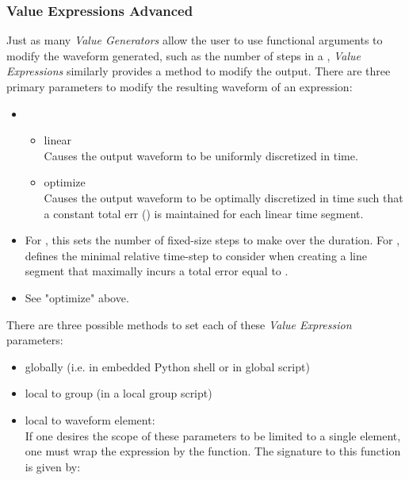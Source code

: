 \subsubsection{Value Expressions Advanced}
Just as many \textit{Value Generators} allow the user to use functional arguments to
modify the waveform generated, such as the number of steps in a ,
\textit{Value Expressions} similarly provides a method to modify the output.
%
There are three primary parameters to modify the resulting waveform of an
expression:
\begin{itemize}
  \item {}
    \begin{itemize}
    \item linear\\
      Causes the output waveform to be uniformly discretized in time.
    \item optimize\\
      Causes the output waveform to be optimally discretized in time such that a
      constant total err () is maintained for each linear
      time segment.
    \end{itemize}
  \item {}
      For , this sets the number of fixed-size steps
      to make over the duration.
      For ,  defines the
      minimal relative time-step to consider when creating a line segment that
      maximally incurs a total error equal to .
  \item {}
      See "optimize" above.
\end{itemize}
%
There are three possible methods to set each of these \textit{Value Expression}
parameters:
\begin{itemize}
  \item globally (i.e. in embedded Python shell or in global script)
  \item local to group (in a local group script)
  \item local to waveform element:\\
    If one desires the scope of these parameters to be limited to a single
    element, one must wrap the expression by the  function.
    The signature to this function is given by:\\
\end{itemize}



